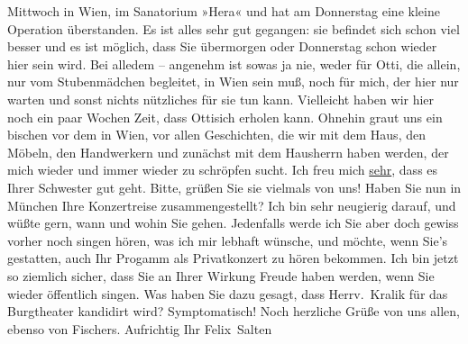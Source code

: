 \begin{ledgroupsized}[t]{13cm}
                  Mittwoch in Wien, im Sanatorium
                  »Hera« und hat am Donnerstag eine kleine
               Operation überstanden. Es ist alles sehr gut gegangen: sie befindet sich schon viel
               besser und es ist möglich, dass Sie übermorgen oder Donnerstag schon wieder hier sein
               wird. Bei alledem – angenehm ist sowas ja nie, weder für Otti, die allein, nur vom Stubenmädchen begleitet, in Wien
               sein muß, noch für mich, der hier nur warten und sonst nichts nützliches für sie tun
               kann. Vielleicht haben wir hier noch ein paar Wochen Zeit, dass Ottisich erholen kann. Ohnehin
               graut uns ein bischen vor dem \label{K_L03560-1v}\label{K_L03560-1h} in Wien, vor allen Geschichten, die wir mit dem Haus,
               den Möbeln, den Handwerkern und zunächst mit dem Hausherrn haben werden, der mich wieder und immer wieder zu schröpfen
               sucht. \pend
           \pstart
           Ich freu mich \uline{sehr}, dass es Ihrer Schwester gut geht. Bitte, grüßen Sie sie
               vielmals von uns! Haben Sie nun in München Ihre
               Konzertreise zusammengestellt? Ich bin sehr neugierig darauf, und wüßte gern, wann
               und wohin Sie gehen. Jedenfalls werde ich Sie aber doch gewiss vorher noch singen
               hören, was ich mir lebhaft wünsche, und möchte, wenn Sie’s gestatten, auch Ihr
               Progamm als Privatkonzert zu hören bekommen. Ich bin jetzt so ziemlich sicher, dass
               Sie an Ihrer Wirkung Freude haben werden, wenn Sie wieder öffentlich singen. \pend
           \pstart
           Was haben Sie dazu gesagt, dass Herrv. Kralik
               für das Burgtheater kandidirt wird?
               Symptomatisch! \pend
           \pstart
           Noch herzliche Grüße von uns allen, ebenso von Fischers.\pend
           \pstart Aufrichtig Ihr \spacefill\mbox{Felix Salten}\pend{}
         

\end{ledgroupsized}
